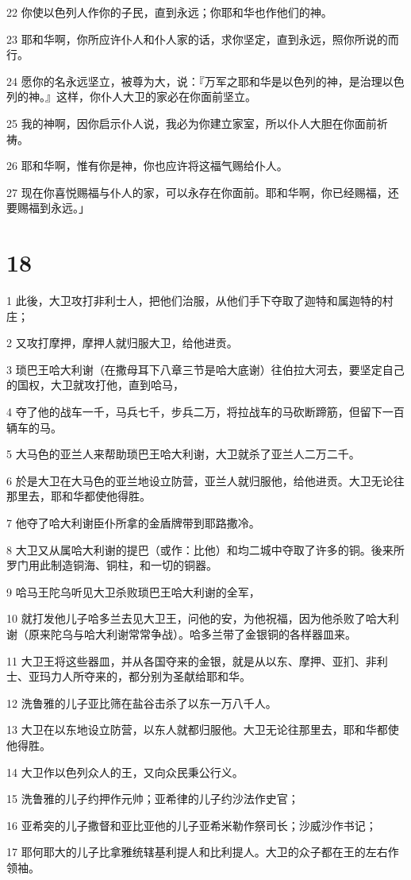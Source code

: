 \par 22 你使以色列人作你的子民，直到永远；你耶和华也作他们的神。
\par 23 耶和华啊，你所应许仆人和仆人家的话，求你坚定，直到永远，照你所说的而行。
\par 24 愿你的名永远坚立，被尊为大，说：『万军之耶和华是以色列的神，是治理以色列的神。』这样，你仆人大卫的家必在你面前坚立。
\par 25 我的神啊，因你启示仆人说，我必为你建立家室，所以仆人大胆在你面前祈祷。
\par 26 耶和华啊，惟有你是神，你也应许将这福气赐给仆人。
\par 27 现在你喜悦赐福与仆人的家，可以永存在你面前。耶和华啊，你已经赐福，还要赐福到永远。」

\chapter{18}

\par 1 此後，大卫攻打非利士人，把他们治服，从他们手下夺取了迦特和属迦特的村庄；
\par 2 又攻打摩押，摩押人就归服大卫，给他进贡。
\par 3 琐巴王哈大利谢（在撒母耳下八章三节是哈大底谢）往伯拉大河去，要坚定自己的国权，大卫就攻打他，直到哈马，
\par 4 夺了他的战车一千，马兵七千，步兵二万，将拉战车的马砍断蹄筋，但留下一百辆车的马。
\par 5 大马色的亚兰人来帮助琐巴王哈大利谢，大卫就杀了亚兰人二万二千。
\par 6 於是大卫在大马色的亚兰地设立防营，亚兰人就归服他，给他进贡。大卫无论往那里去，耶和华都使他得胜。
\par 7 他夺了哈大利谢臣仆所拿的金盾牌带到耶路撒冷。
\par 8 大卫又从属哈大利谢的提巴（或作：比他）和均二城中夺取了许多的铜。後来所罗门用此制造铜海、铜柱，和一切的铜器。
\par 9 哈马王陀乌听见大卫杀败琐巴王哈大利谢的全军，
\par 10 就打发他儿子哈多兰去见大卫王，问他的安，为他祝福，因为他杀败了哈大利谢（原来陀乌与哈大利谢常常争战）。哈多兰带了金银铜的各样器皿来。
\par 11 大卫王将这些器皿，并从各国夺来的金银，就是从以东、摩押、亚扪、非利士、亚玛力人所夺来的，都分别为圣献给耶和华。
\par 12 洗鲁雅的儿子亚比筛在盐谷击杀了以东一万八千人。
\par 13 大卫在以东地设立防营，以东人就都归服他。大卫无论往那里去，耶和华都使他得胜。
\par 14 大卫作以色列众人的王，又向众民秉公行义。
\par 15 洗鲁雅的儿子约押作元帅；亚希律的儿子约沙法作史官；
\par 16 亚希突的儿子撒督和亚比亚他的儿子亚希米勒作祭司长；沙威沙作书记；
\par 17 耶何耶大的儿子比拿雅统辖基利提人和比利提人。大卫的众子都在王的左右作领袖。

